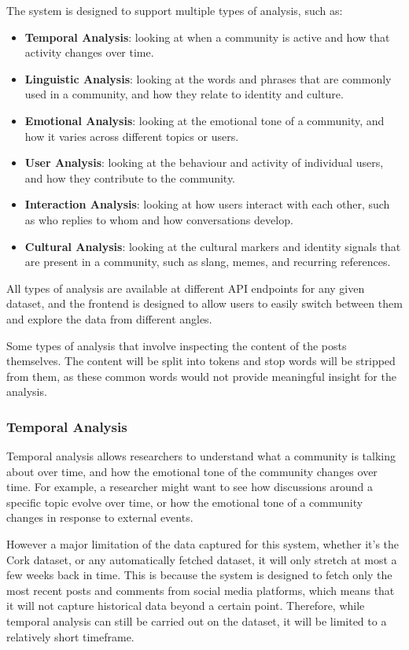 \documentclass[12pt, a4paper]{article}
\begin{document}
The system is designed to support multiple types of analysis, such as:
\begin{itemize}
    \item \textbf{Temporal Analysis}: looking at when a community is active and how that activity changes over time.
    \item \textbf{Linguistic Analysis}: looking at the words and phrases that are commonly used in a community, and how they relate to identity and culture.
    \item \textbf{Emotional Analysis}: looking at the emotional tone of a community, and how it varies across different topics or users.
    \item \textbf{User Analysis}: looking at the behaviour and activity of individual users, and how they contribute to the community.
    \item \textbf{Interaction Analysis}: looking at how users interact with each other, such as who replies to whom and how conversations develop.
    \item \textbf{Cultural Analysis}: looking at the cultural markers and identity signals that are present in a community, such as slang, memes, and recurring references.
\end{itemize}

All types of analysis are available at different API endpoints for any given dataset, and the frontend is designed to allow users to easily switch between them and explore the data from different angles.

Some types of analysis that involve inspecting the content of the posts themselves. The content will be split into tokens and stop words will be stripped from them, as these common words would not provide meaningful insight for the analysis.

\subsubsection{Temporal Analysis}
Temporal analysis allows researchers to understand what a community is talking about over time, and how the emotional tone of the community changes over time. For example, a researcher might want to see how discussions around a specific topic evolve over time, or how the emotional tone of a community changes in response to external events.

However a major limitation of the data captured for this system, whether it's the Cork dataset, or any automatically fetched dataset, it will only stretch at most a few weeks back in time. This is because the system is designed to fetch only the most recent posts and comments from social media platforms, which means that it will not capture historical data beyond a certain point. Therefore, while temporal analysis can still be carried out on the dataset, it will be limited to a relatively short timeframe.
\end{document}
